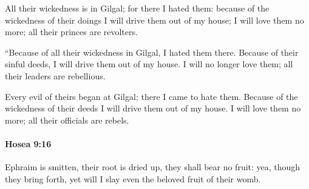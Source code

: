 			\begin{versebox}
					\item[BHS] 
					\item[LXX] 
					\item[ASV] All their wickedness is in Gilgal; for there I hated them: because of the wickedness of their doings I will drive them out of my house; I will love them no more; all their princes are revolters.
					\item[NIV] “Because of all their wickedness in Gilgal, I hated them there. Because of their sinful deeds, I will drive them out of my house. I will no longer love them; all their leaders are rebellious.
					\item[NRSV] Every evil of theirs began at Gilgal; there I came to hate them. Because of the wickedness of their deeds I will drive them out of my house. I will love them no more; all their officials are rebels.
			\end{versebox}

		\paragraph{Hosea 9:16} %
			\label{HOSEA-9-16}

			Ephraim is smitten, their root is dried up, they shall bear no fruit: yea, though they bring forth, yet will I slay even the beloved fruit of their womb.

